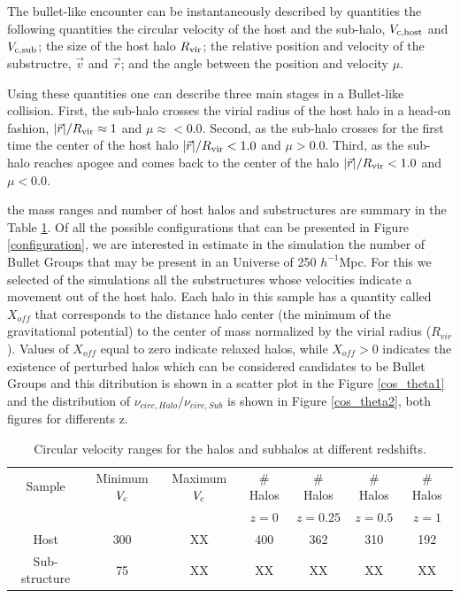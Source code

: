 \documentclass{emulateapj}
\newcommand{\kms}{{\ifmmode{{\mathrm{\,km\ s}^{-1}}}\else{\,km~s$^{-1}$}\fi}}
\begin{document}
The bullet-like encounter can be instantaneously described by
quantities the following quantities the circular velocity of the host
and the sub-halo, $V_{\rm c,host}$ and $V_{\rm c,  sub}$; the size of
the host halo $R_{\rm vir}$; the relative position and velocity of the
substructre, $\vec{v}$ and $\vec{r}$; and the angle between the
position and velocity $\mu$. 

Using these quantities one can describe three main stages in a
Bullet-like collision. First, the sub-halo crosses the virial radius
of the host halo in a head-on fashion, $|\vec{r}|/R_{\rm vir}\approx
1$ and $\mu\approx<0.0$. Second, as the sub-halo crosses for the first
time the center of the host halo $|\vec{r}|/R_{\rm vir} <
1.0$ and $\mu>0.0$. Third, as the sub-halo reaches apogee and
comes back to the center of the halo $|\vec{r}|/R_{\rm vir} < 1.0$ and
$\mu<0.0$.


the 
mass ranges and number of host halos and substructures 
are summary in the Table \ref{table1}. Of all the possible configurations that can be presented
in Figure \ref{configuration}, we are interested in estimate in the simulation the number 
of Bullet Groups that may be present in an Universe of 250 $h^{-1}$Mpc. For this we selected 
of the simulations all the substructures  
whose velocities indicate a movement out of the host halo. Each halo in this sample has a quantity
called $X_{off}$ that corresponds to the distance halo center (the minimum of the gravitational potential) to 
the center of mass normalized by the
virial radius ($R_{vir}$). Values of $X_{off}$
equal to zero indicate relaxed halos, while $X_{off}>0$ indicates the existence
of perturbed halos which can be considered candidates to be Bullet Groups and this ditribution is shown 
in a scatter plot in the Figure \ref{cos_theta1} and the distribution of $\nu_{circ,Halo}/\nu_{circ,Sub}$ 
is shown in  Figure \ref{cos_theta2}, both figures for differents z. 


\begin{table}
\begin{center}
\begin{tabular}{ccccccc}\hline\hline
Sample       & Minimum $V_{\rm c}$         & Maximum $V_{\rm c}$          & \# Halos  & \# Halos  & \# Halos & \# Halos \\
             & \kms    & \kms  &   $z=0$   & $z=0.25$  & $z=0.5$  & $z=1$  \\\hline
Host   & 300\kms & XX &    400    &   362     &   310    &  192   \\ 
Sub-structure & 75\kms  & XX &    XX   &   XX     &   XX    &  XX   \\\hline
\end{tabular} 
\caption{Circular velocity ranges for the halos and subhalos at
  different redshifts.}  
\label{table1}
\end{center}
\end{table}
\end{document}
